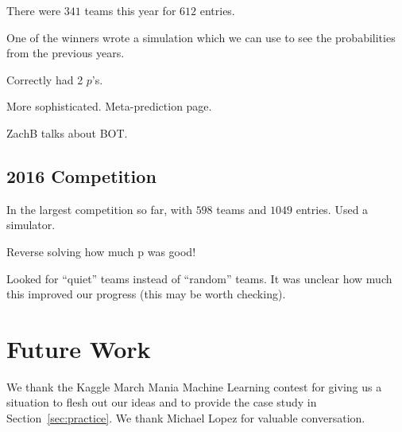 \documentclass[12pt,twoside,singlespace]{article}
\numberwithin{equation}{section}
\theoremstyle{definition}
\begin{document}
There were $341$ teams this year for $612$ entries.

One of the winners wrote a simulation which we can use to see the probabilities from the previous years.

Correctly had 2 $p$'s.

More sophisticated. Meta-prediction page.

ZachB talks about BOT.

\subsection{2016 Competition}

In the largest competition so far, with $598$ teams and $1049$ entries.
Used a simulator.

Reverse solving how much p was good!

Looked for ``quiet'' teams instead of ``random'' teams. It was unclear how much this improved our progress (this may be worth checking).

\section{Future Work}

We thank the Kaggle March Mania Machine Learning contest for giving us a situation to flesh out our ideas and to provide the case study in Section~\ref{sec:practice}. We thank Michael Lopez for valuable conversation.



\end{document}
